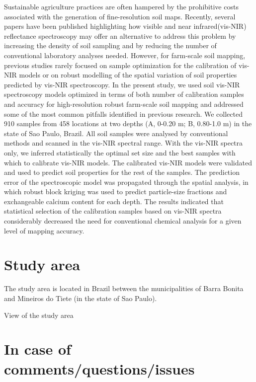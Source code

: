 \documentclass[]{book}
\begin{document}
Sustainable agriculture practices are often hampered by the prohibitive costs associated with the generation of fine-resolution soil maps. Recently, several papers have been published highlighting how visible and near infrared(vis-NIR) reflectance spectroscopy may offer an alternative to address this problem by increasing the density of soil sampling and by reducing the number of conventional laboratory analyses needed. However, for farm-scale soil mapping, previous studies rarely focused on sample optimization for the calibration of vis-NIR models or on robust modelling of the spatial variation of soil properties predicted by vis-NIR spectroscopy. In the present study, we used soil vis-NIR spectroscopy models optimized in terms of both number of calibration samples and accuracy for high-resolution robust farm-scale soil mapping and addressed some of the most common pitfalls identified in previous research. We collected 910 samples from 458 locations at two depths (A, 0-0.20 m; B, 0.80-1.0 m) in the state of Sao Paulo, Brazil. All soil samples were analysed by conventional methods and scanned in the vis-NIR spectral range. With the vis-NIR spectra only, we inferred statistically the optimal set size and the best samples with which to calibrate vis-NIR models. The calibrated vis-NIR models were validated and used to predict soil properties for the rest of the samples. The prediction error of the spectroscopic model was propagated through the spatial analysis, in which robust block kriging was used to predict particle-size fractions and exchangeable calcium content for each depth. The results indicated that statistical selection of the calibration samples based on vis-NIR spectra considerably decreased the need for conventional chemical analysis for a given level of mapping accuracy.

\hypertarget{study-area}{%
\section{Study area}\label{study-area}}

The study area is located in Brazil between the municipalities of Barra Bonita and Mineiros do Tiete (in the state of Sao Paulo).

\hypertarget{htmlwidget-4a8fbaf5c5d6d8b2878c}{}

\label{fig:unnamed-chunk-2}View of the study area

\hypertarget{in-case-of-commentsquestionsissues}{%
\section{In case of comments/questions/issues}\label{in-case-of-commentsquestionsissues}}
\end{document}
